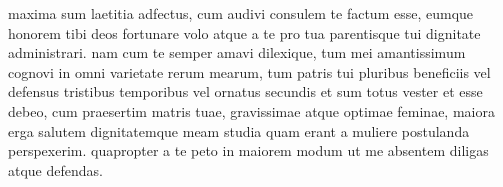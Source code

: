 


 maxima sum laetitia adfectus, cum audivi consulem te factum esse, eumque honorem tibi deos fortunare volo atque a te pro tua parentisque tui dignitate administrari. nam cum te semper amavi dilexique, tum mei amantissimum cognovi in omni varietate rerum mearum, tum patris tui pluribus beneficiis vel defensus tristibus temporibus vel ornatus secundis et sum totus vester et esse debeo, cum praesertim matris tuae, gravissimae atque optimae feminae, maiora erga salutem dignitatemque meam studia quam erant a muliere postulanda perspexerim. quapropter a te peto in maiorem modum ut me absentem diligas atque defendas.
